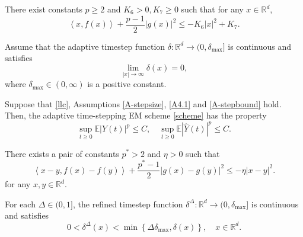 \documentclass[10pt,a4paper]{amsart}
\begin{document}
\begin{assumption}  \label{A4.1}
There exist constants $p \ge 2$ and ${K_6} >0,{K_7} \ge 0$ such that for any $x \in \mathbb{R}^d$,
\begin{equation*}
	\left\langle {x,f(x)} \right\rangle  + \frac{{p - 1}}{2}{\left| {g(x)} \right|^2} \le  - {K_6}{\left| x \right|^2} + {K_7}.
\end{equation*}
\end{assumption}

\begin{assumption}  \label{A-stepbound}
	Assume that the adaptive timestep function $\delta: \mathbb{R}^d \to (0, \delta_{\max}]$ is continuous and satisfies
	\begin{equation*}
		\mathop {\lim }\limits_{|x| \to \infty } \delta (x) = 0, 
	\end{equation*}
 where $\delta_{\max} \in (0, \infty)$ is a positive constant.
\end{assumption}

\begin{theorem}  \label{th-bounded}
Suppose that \eqref{llc}, Assumptions \ref{A-stepsize}, \ref{A4.1} and \ref{A-stepbound} hold. Then, the adaptive time-stepping EM scheme \eqref{scheme} has the property
\begin{equation*} 
	 \mathop {\sup }\limits_{t \ge 0} \mathbb{E}{\left| {Y(t)} \right|^p} \le C,  \quad \mathop {\sup }\limits_{t \ge 0} \mathbb{E}{\left| {\hat Y(t)} \right|^p} \le C.
\end{equation*}
\end{theorem}

\begin{assumption}  \label{A5.1}
There exists a pair of constants $p^* > 2$ and $\eta>0$ such that 
\begin{equation*}
	\left\langle {x - y,f(x) - f(y)} \right\rangle  + \frac{{{p^*} - 1}}{2}{\left| {g(x) - g(y)} \right|^2} \le  - \eta {\left| {x - y} \right|^2}.
\end{equation*}
for any $x, y \in \mathbb{R}^d$.
\end{assumption}

\begin{assumption}  \label{A6.2}
For each $\Delta \in (0, 1]$, the refined timestep function $\delta^\Delta: \mathbb{R}^d \to (0, \delta_{\max}]$ is continuous and satisfies
\begin{equation*}
	0 < {\delta ^\Delta }(x) < \min \left\{ {\Delta {\delta _{\max }},\delta (x)} \right\}, \quad  x \in \mathbb{R}^d.
\end{equation*}
\end{assumption}
\end{document}
